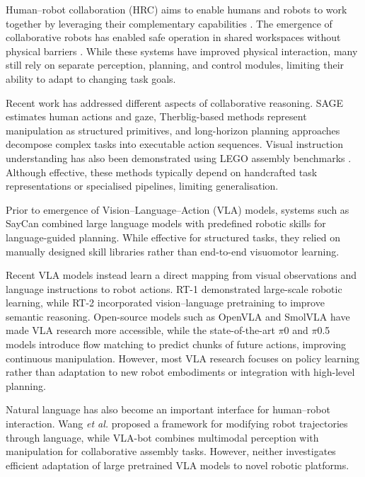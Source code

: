 \documentclass[conference, 12pt]{IEEEtran}
\begin{document}
Human--robot collaboration (HRC) aims to enable humans and robots to work together by leveraging their complementary capabilities \cite{ajoudani2018progress}. The emergence of collaborative robots has enabled safe operation in shared workspaces without physical barriers \cite{robotics8040100}. While these systems have improved physical interaction, many still rely on separate perception, planning, and control modules, limiting their ability to adapt to changing task goals.

Recent work has addressed different aspects of collaborative reasoning. SAGE \cite{kuang2025sage} estimates human actions and gaze, Therblig-based methods \cite{reinhardt2024therblig} represent manipulation as structured primitives, and long-horizon planning approaches \cite{Chen_2025} decompose complex tasks into executable action sequences. Visual instruction understanding has also been demonstrated using LEGO assembly benchmarks \cite{wang2022translating,walsman2022break}. Although effective, these methods typically depend on handcrafted task representations or specialised pipelines, limiting generalisation.

Prior to emergence of Vision--Language--Action (VLA) models, systems such as SayCan \cite{ahn2022icanisay} combined large language models with predefined robotic skills for language-guided planning. While effective for structured tasks, they relied on manually designed skill libraries rather than end-to-end visuomotor learning.

Recent VLA models instead learn a direct mapping from visual observations and language instructions to robot actions. RT-1 \cite{brohan2023rt1roboticstransformerrealworld} demonstrated large-scale robotic learning, while RT-2 \cite{brohan2023rt2visionlanguageactionmodelstransfer} incorporated vision--language pretraining to improve semantic reasoning. Open-source models such as OpenVLA \cite{kim2024openvlaopensourcevisionlanguageactionmodel} and SmolVLA \cite{shukor2025smolvlavisionlanguageactionmodelaffordable} have made VLA research more accessible, while the state-of-the-art $\pi$0 \cite{black2026pi0visionlanguageactionflowmodel} and $\pi$0.5 \cite{intelligence2025pi05visionlanguageactionmodelopenworld} models introduce flow matching to predict chunks of future actions, improving continuous manipulation. However, most VLA research focuses on policy learning rather than adaptation to new robot embodiments or integration with high-level planning.

Natural language has also become an important interface for human--robot interaction. Wang \textit{et al.} \cite{wang2026bidirectionalhumanrobotcommunicationphysical} proposed a framework for modifying robot trajectories through language, while VLA-bot \cite{WANG2026103268} combines multimodal perception with manipulation for collaborative assembly tasks. However, neither investigates efficient adaptation of large pretrained VLA models to novel robotic platforms.
\end{document}
